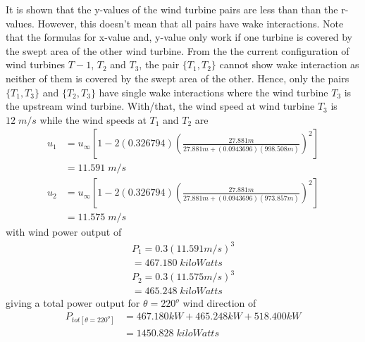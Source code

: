 It is shown that the y-values of the wind turbine pairs are less than than the r-values. However, this doesn't mean that all pairs have wake interactions. Note that the formulas for x-value and, y-value only work if one turbine is covered by the swept area of the other wind turbine. From the the current configuration of wind turbines $T-1$, $T_2$ and $T_3$, the pair $\{T_1,T_2\}$ cannot show wake interaction as neither of them is covered by the swept area of the other. Hence, only the pairs $\{T_1,T_3\}$ and $\{T_2,T_3\}$ have single wake interactions where the wind turbine $T_3$ is the upstream wind turbine. With/that, the wind speed at wind turbine $T_3$ is $12\;m/s$ while the wind speeds at $T_1$ and $T_2$ are
	\begin{align*}
        u_{1} &= u_\infty \left[ 1-2(0.326794)\left( \frac{27.881m}{27.881m+(0.0943696) (998.508m)} \right)^2 \right] \\
        &=11.591\;m/s
    \end{align*}
    \begin{align*}
        u_{2} &= u_\infty \left[ 1-2(0.326794)\left( \frac{27.881m}{27.881m+(0.0943696) (973.857m)} \right)^2 \right] \\
        &=11.575\;m/s
    \end{align*}
with wind power output of
	\begin{align*}
		P_1=0.3(11.591m/s)^3 \\
		=467.180\;kiloWatts
	\end{align*}
	\begin{align*}
		P_2=0.3(11.575m/s)^3 \\
		=465.248\;kiloWatts
	\end{align*}
giving a total power output for $\theta=220^o$ wind direction of
	\begin{align*}
		P_{tot[\theta=220^o]} &= 467.180kW + 465.248kW + 518.400kW \\
		&=1450.828\;kiloWatts
	\end{align*}
    
